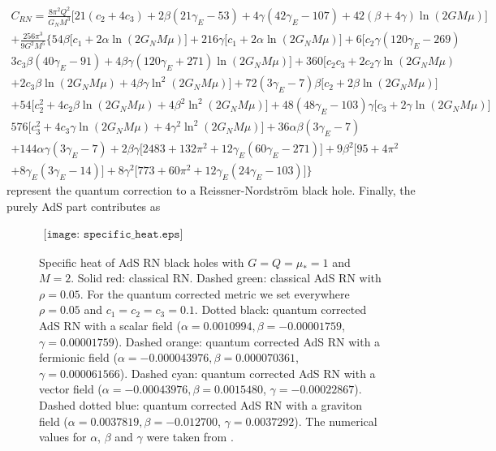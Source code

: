 \documentclass[10pt,a4paper]{article}
\begin{document}
\begin{multline}
   C_{RN}=\frac{8\pi^2Q^2}{G_NM^3}\Big[21(c_2+4c_3)+2\beta(21\gamma_E-53)+4\gamma(42\gamma_E-107)+42(\beta+4\gamma)\ln(2GM\mu)\Big]\\
   +\frac{256\pi^3}{9G^2M^5}\bigg\{54\beta\Big[c_1+2\alpha\ln(2G_NM\mu)\Big]+216\gamma\Big[c_1+2\alpha\ln(2G_NM\mu)\Big]+6\Big[c_2\gamma(120\gamma_E-269)\\
   3c_3\beta(40\gamma_E-91)+4\beta\gamma(120\gamma_E+271)\ln(2G_NM\mu)\Big]+360\Big[c_2c_3+2c_2\gamma\ln(2G_NM\mu)\\
   +2c_3\beta\ln(2G_NM\mu)+4\beta\gamma\ln^2(2G_NM\mu)\Big]+72(3\gamma_E-7)\beta\Big[c_2+2\beta\ln(2G_NM\mu)\Big]\\
   +54\Big[c_2^2+4c_2\beta\ln(2G_NM\mu)+4\beta^2\ln^2(2G_NM\mu)\Big]+48(48\gamma_E-103)\gamma\Big[c_3+2\gamma\ln(2G_NM\mu)\Big]\\
   576\Big[c^2_3+4c_3\gamma\ln(2G_NM\mu)+4\gamma^2\ln^2(2G_NM\mu)\Big]+36\alpha\beta(3\gamma_E-7)\\+144\alpha\gamma(3\gamma_E-7)
   +2\beta\gamma\Big[2483+132\pi^2+12\gamma_E(60\gamma_E-271)\Big]+9\beta^2\Big[95+4\pi^2\\+8\gamma_E(3\gamma_E-14)\Big]
   +8\gamma^2\Big[773+60\pi^2+12\gamma_E(24\gamma_E-103)\Big]\bigg\}
\end{multline}
represent the quantum correction to a Reissner-Nordstr\"om black hole. Finally, the purely AdS part contributes as
\begin{figure}
\begin{center}$
\begin{array}{cccc}
\texttt{[image: specific\_heat.eps]}
\end{array}$
\end{center}
\caption{Specific heat of AdS RN black holes with $G=Q=\mu_{*}=1$ and $M=2$. Solid red: classical RN. Dashed green: classical AdS RN with $\rho=0.05$. For the quantum corrected metric we set everywhere $\rho=0.05$ and $c_1=c_{2}=c_{3}=0.1$. Dotted black: quantum corrected AdS RN with a scalar field ($\alpha=0.0010994, \beta=-0.00001759$, $\gamma=0.00001759$). Dashed orange: quantum corrected AdS RN with a fermionic field ($\alpha=-0.000043976, \beta=0.000070361$, $\gamma=0.000061566$). Dashed cyan: quantum corrected AdS RN with a vector field ($\alpha=-0.00043976, \beta=0.0015480$, $\gamma=-0.00022867$). Dashed dotted blue: quantum corrected AdS RN with a graviton field ($\alpha=0.0037819, \beta=-0.012700$, $\gamma=0.0037292$). The numerical values for $\alpha$, $\beta$ and $\gamma$ were taken from \cite{Donoghue:2014yha}.}
\label{fig4}
\end{figure}
\end{document}

